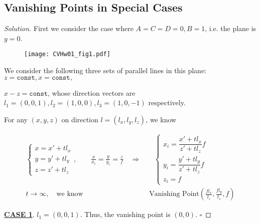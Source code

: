 \documentclass{article}
\newenvironment{solution}{\begin{proof}[\noindent\it Solution]}{\end{proof}}
\newcommand{\whiteqed}{\hfill $\square$\par}
\begin{document}
\vspace{1em}
\subsection{Vanishing Points in Special Cases}
\vspace{1em}
\begin{solution}
    First we consider the case where $A=C=D=0, B=1$, i.e. the plane is $y=0$.

    \begin{figure}[htbp]
    	\centering
    	{\texttt{[image: CVHw01\_fig1.pdf]}}
    \end{figure}

    \vspace{-1.25em} \hspace{2.6em}
    We consider the following three sets of parallel lines in this plane: $z=\mathtt{const}, x=\mathtt{const},$
    
    $x-z=\mathtt{const}$, whose direction vectors are $l_1=(0,0,1), l_2=(1,0,0), l_3=(1,0,-1)$ respectively.

    \hspace{2.6em}
    For any $(x,y,z)$ on direction $l=(l_x,l_y,l_z)$, we know 
    
    \vspace{-2em}
    \begin{align*}
        \left\{\begin{array}{c}
            x = x' + tl_x \\
            y = y' + tl_y \\
            z = z' + tl_z
        \end{array}\right.,\qquad \frac{x}{x_i}=\frac{y}{y_i}=\frac{z}{f} \quad\Longrightarrow &\quad \left\{\begin{array}{l}
            x_i = \dfrac{x'+tl_x}{z'+tl_z}f \\
            y_i = \dfrac{y'+tl_y}{z'+tl_z}f \\
            z_i = f
        \end{array}
            \right. \\
        t\to\infty, \quad\text{we know}
        & \text{ Vanishing Point}\left(\frac{fl_x}{l_z},\frac{fl_y}{l_z},f\right)
    \end{align*}

    \vspace{-0.5em} \hspace{2.6em}
    \underline{\textbf{CASE 1}}. $l_1=(0,0,1).$ Thus, the vanishing point is $(0,0)$. \whiteqed


\end{solution}
\end{document}
